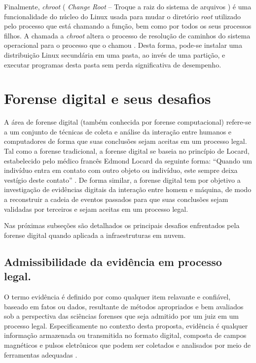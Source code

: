 Finalmente, \textit{chroot} ( \textit{Change Root} -- Troque a raiz do sistema de arquivos ) é uma funcionalidade do núcleo do Linux usada para mudar o diretório \textit{root} utilizado pelo processo que está chamando a função, bem como por todos os seus processos filhos. 
%
A chamada a \textit{chroot} altera o processo de resolução de caminhos do sistema operacional para o processo que o chamou \cite{UnixManPagesChRoot}.
%
Desta forma, pode-se instalar uma distribuição Linux secundária em uma pasta, ao invés de uma partição, e executar programas desta pasta sem perda significativa de desempenho.


\section{Forense digital e seus desafios}
\label{sec:forensedigital}


A área de forense digital (também conhecida por forense computacional) refere-se a um conjunto de técnicas de coleta e análise da interação entre humanos e computadores de forma que suas conclusões sejam aceitas em um processo legal.
%
Tal como a forense tradicional, a forense digital se baseia no princípio de Locard, estabelecido pelo médico francês Edmond Locard da seguinte forma: ``Quando um indivíduo entra em contato com outro objeto ou indivíduo, este sempre deixa vestígio deste contato'' \cite[p.~31]{Ramos:2011}.
%
De forma similar, a forense digital tem por objetivo a investigação de evidências digitais da interação entre homem e máquina, de modo a reconstruir a cadeia de eventos passados para que suas conclusões sejam validadas por terceiros e sejam aceitas em um processo legal.
 

Nas próximas subseções são detalhados os principais desafios enfrentados pela forense digital quando aplicada a infraestruturas em nuvem.

\subsection{Admissibilidade da evidência em processo legal.}
\label{sec:credibilidadeaceitabilidadeevidencia}

O termo evidência é definido por \cite[p.~1]{LuisDigitalChainOfCustody:2016} como qualquer item relavante e confiável, baseado em fatos ou dados, resultante de métodos apropriados e bem avaliados sob a perspectiva das sciências forenses que seja admitido por um juiz em um processo legal.
%
Especificamente no contexto desta proposta, evidência é qualquer informação armazenada ou transmitida no formato digital, composta de campos magnéticos e pulsos eletrônicos que podem ser coletados e analisados por meio de ferramentas adequadas \cite[p.~38]{Ramos:2011}.
%

